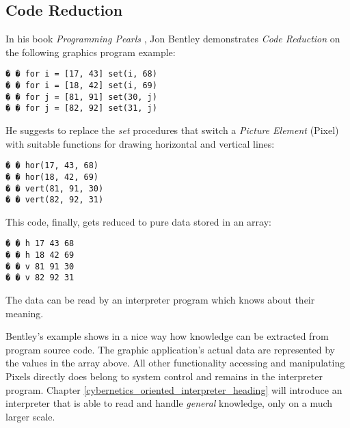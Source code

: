 %
%
%
%
%
%
%

\subsection{Code Reduction}
\label{code_reduction_heading}

In his book \emph{Programming Pearls} \cite[page 128]{bentley}, Jon Bentley
demonstrates \emph{Code Reduction} on the following graphics program example:

\begin{scriptsize}
    \begin{verbatim}
� � for i = [17, 43] set(i, 68)
� � for i = [18, 42] set(i, 69)
� � for j = [81, 91] set(30, j)
� � for j = [82, 92] set(31, j)
    \end{verbatim}
\end{scriptsize}

He suggests to replace the \emph{set} procedures that switch a
\emph{Picture Element} (Pixel) with suitable functions for drawing horizontal
and vertical lines:

\begin{scriptsize}
    \begin{verbatim}
� � hor(17, 43, 68)
� � hor(18, 42, 69)
� � vert(81, 91, 30)
� � vert(82, 92, 31)
    \end{verbatim}
\end{scriptsize}

This code, finally, gets reduced to pure data stored in an array:

\begin{scriptsize}
    \begin{verbatim}
� � h 17 43 68
� � h 18 42 69
� � v 81 91 30
� � v 82 92 31
    \end{verbatim}
\end{scriptsize}

The data can be read by an interpreter program which knows about their meaning.

Bentley's example shows in a nice way how knowledge can be extracted from program
source code. The graphic application's actual data are represented by the values
in the array above. All other functionality accessing and manipulating Pixels
directly does belong to system control and remains in the interpreter program.
Chapter \ref{cybernetics_oriented_interpreter_heading} will introduce an
interpreter that is able to read and handle \emph{general} knowledge, only on a
much larger scale.
